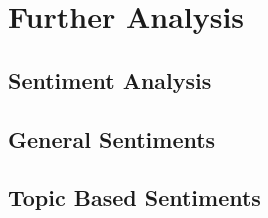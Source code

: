 \chapter{Further Analysis}
\label{cha:further_analysis}

\section{Sentiment Analysis} %
\label{sec:sentiment_analysis}


\section{General Sentiments} %
\label{sec:general_sentiments}


\section{Topic Based Sentiments} %
\label{sec:topic_based_sentiments}
